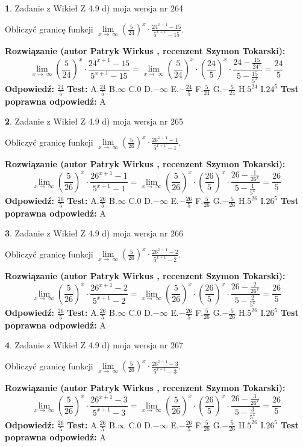 \documentclass[12pt, a4paper]{article}
\theoremstyle{definition} %
\newtheorem{zad}{}
\newcommand{\zadStart}[1]{\begin{zad}#1\newline}
\newcommand{\zadStop}{\end{zad}}
\newcommand{\rozwStart}[2]{\noindent \textbf{Rozwiązanie (autor #1 , recenzent #2): }\newline}
\newcommand{\rozwStop}{\newline}
\newcommand{\odpStart}{\noindent \textbf{Odpowiedź:}\newline}
\newcommand{\odpStop}{\newline}
\newcommand{\testStart}{\noindent \textbf{Test:}\newline}
\newcommand{\testStop}{\newline}
\newcommand{\kluczStart}{\noindent \textbf{Test poprawna odpowiedź:}\newline}
\newcommand{\kluczStop}{\newline}
\begin{document}
\zadStart{Zadanie z Wikieł Z 4.9 d) moja wersja nr 264}


Obliczyć granicę funkcji  $\lim\limits_{x\to\ \infty}(\frac{5}{24})^{x}\cdot\frac{24^{x+1}-15}{5^{x+1}-15}$.
\zadStop
\rozwStart{Patryk Wirkus}{Szymon Tokarski}
$$\lim\limits_{x\to\ \infty}(\frac{5}{24})^{x}\cdot\frac{24^{x+1}-15}{5^{x+1}-15}=\lim\limits_{x\to\ \infty}(\frac{5}{24})^{x}\cdot(\frac{24}{5})^{x} \cdot \frac{24-\frac{15}{24^{x}}}{5-\frac{15}{5^{x}}} = \frac{24}{5}$$
\rozwStop
\odpStart
$\frac{24}{5}$
\odpStop
\testStart
A.$\frac{24}{5}$ B.$\infty$ C.$0$ D.$-\infty$ E.$-\frac{24}{5}$
F.$\frac{5}{24}$ G.$-\frac{5}{24}$
H.$5^{24}$
I.$24^{5}$
\testStop
\kluczStart
A
\kluczStop



\zadStart{Zadanie z Wikieł Z 4.9 d) moja wersja nr 265}


Obliczyć granicę funkcji  $\lim\limits_{x\to\ \infty}(\frac{5}{26})^{x}\cdot\frac{26^{x+1}-1}{5^{x+1}-1}$.
\zadStop
\rozwStart{Patryk Wirkus}{Szymon Tokarski}
$$\lim\limits_{x\to\ \infty}(\frac{5}{26})^{x}\cdot\frac{26^{x+1}-1}{5^{x+1}-1}=\lim\limits_{x\to\ \infty}(\frac{5}{26})^{x}\cdot(\frac{26}{5})^{x} \cdot \frac{26-\frac{1}{26^{x}}}{5-\frac{1}{5^{x}}} = \frac{26}{5}$$
\rozwStop
\odpStart
$\frac{26}{5}$
\odpStop
\testStart
A.$\frac{26}{5}$ B.$\infty$ C.$0$ D.$-\infty$ E.$-\frac{26}{5}$
F.$\frac{5}{26}$ G.$-\frac{5}{26}$
H.$5^{26}$
I.$26^{5}$
\testStop
\kluczStart
A
\kluczStop



\zadStart{Zadanie z Wikieł Z 4.9 d) moja wersja nr 266}


Obliczyć granicę funkcji  $\lim\limits_{x\to\ \infty}(\frac{5}{26})^{x}\cdot\frac{26^{x+1}-2}{5^{x+1}-2}$.
\zadStop
\rozwStart{Patryk Wirkus}{Szymon Tokarski}
$$\lim\limits_{x\to\ \infty}(\frac{5}{26})^{x}\cdot\frac{26^{x+1}-2}{5^{x+1}-2}=\lim\limits_{x\to\ \infty}(\frac{5}{26})^{x}\cdot(\frac{26}{5})^{x} \cdot \frac{26-\frac{2}{26^{x}}}{5-\frac{2}{5^{x}}} = \frac{26}{5}$$
\rozwStop
\odpStart
$\frac{26}{5}$
\odpStop
\testStart
A.$\frac{26}{5}$ B.$\infty$ C.$0$ D.$-\infty$ E.$-\frac{26}{5}$
F.$\frac{5}{26}$ G.$-\frac{5}{26}$
H.$5^{26}$
I.$26^{5}$
\testStop
\kluczStart
A
\kluczStop



\zadStart{Zadanie z Wikieł Z 4.9 d) moja wersja nr 267}


Obliczyć granicę funkcji  $\lim\limits_{x\to\ \infty}(\frac{5}{26})^{x}\cdot\frac{26^{x+1}-3}{5^{x+1}-3}$.
\zadStop
\rozwStart{Patryk Wirkus}{Szymon Tokarski}
$$\lim\limits_{x\to\ \infty}(\frac{5}{26})^{x}\cdot\frac{26^{x+1}-3}{5^{x+1}-3}=\lim\limits_{x\to\ \infty}(\frac{5}{26})^{x}\cdot(\frac{26}{5})^{x} \cdot \frac{26-\frac{3}{26^{x}}}{5-\frac{3}{5^{x}}} = \frac{26}{5}$$
\rozwStop
\odpStart
$\frac{26}{5}$
\odpStop
\testStart
A.$\frac{26}{5}$ B.$\infty$ C.$0$ D.$-\infty$ E.$-\frac{26}{5}$
F.$\frac{5}{26}$ G.$-\frac{5}{26}$
H.$5^{26}$
I.$26^{5}$
\testStop
\kluczStart
A
\kluczStop
\end{document}
